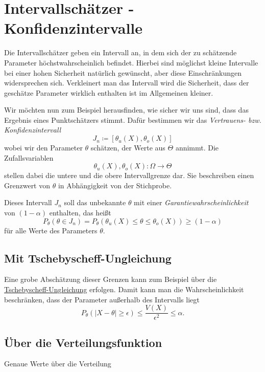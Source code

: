 \section{Intervallschätzer - Konfidenzintervalle}
Die Intervallschätzer geben ein Intervall an, in dem sich der zu schätzende Parameter höchstwahrscheinlich befindet. Hierbei sind möglichst kleine Intervalle bei einer hohen Sicherheit natürlich gewünscht, aber diese Einschränkungen widersprechen sich. 
Verkleinert man das Intervall wird die Sicherheit, dass der geschätze Parameter wirklich enthalten ist im Allgemeinen kleiner.

Wir möchten nun zum Beispiel herausfinden, wie sicher wir uns sind, dass das Ergebnis eines Punktschätzers stimmt. Dafür bestimmen wir das \emph{Vertrauens- bzw. Konfidenzintervall}
\begin{equation*}
	J_n\coloneqq [\theta_u(X),\theta_o(X)]
\end{equation*}
wobei wir den Parameter $\theta$ schätzen, der Werte aus $\Theta$ annimmt. Die Zufallsvariablen 
\begin{equation*}
	\theta_u(X),\theta_o(X): \Omega\rightarrow \Theta
\end{equation*}
stellen dabei die untere und die obere Intervallgrenze dar. Sie beschreiben einen Grenzwert von $\theta$ in Abhängigkeit von der Stichprobe.

Dieses Intervall $J_n$ soll das unbekannte $\theta$ mit einer \emph{Garantiewahrscheinlichkeit} von $(1-\alpha)$ enthalten, das heißt
\begin{equation*}
	P_\theta (\theta\in J_n)=P_\theta(\theta_u(X)\leq \theta\leq \theta_o(X))\geq (1-\alpha)
\end{equation*}
für alle Werte des Parameters $\theta$.

\subsection{Mit Tschebyscheff-Ungleichung}
Eine grobe Abschätzung dieser Grenzen kann zum Beispiel über die \hyperref[tschebyscheff]{Tschebyscheff-Ungleichung} erfolgen.
Damit kann man die Wahrscheinlichkeit beschränken, dass der Parameter außerhalb des Intervalls liegt
\begin{equation*}
	P_\theta(|X-\theta|\geq \epsilon)\leq \frac{V(X)}{\epsilon^2}\leq \alpha.
\end{equation*}


\subsection{Über die Verteilungsfunktion}
Genaue Werte über die Verteilung

